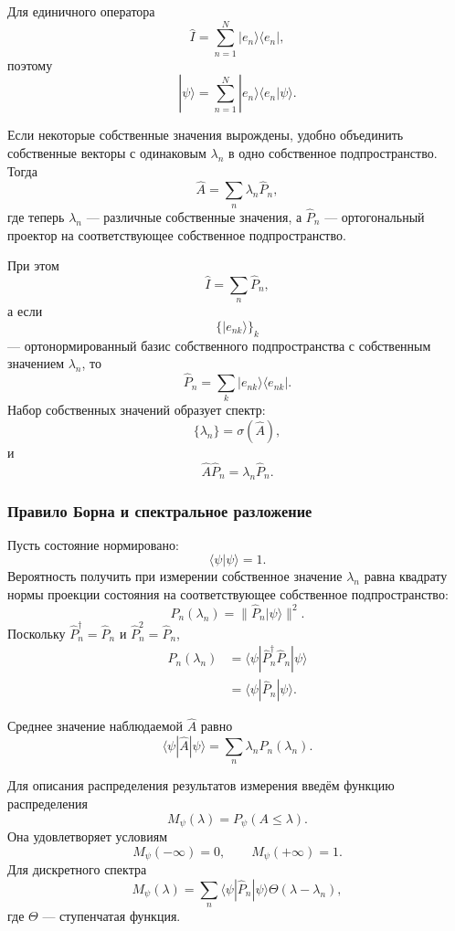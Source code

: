 \documentclass[12pt,a4paper]{article}
\begin{document}
Для единичного оператора
\[
    \boxed{
        \hat I
        =
        \sum_{n=1}^{N}
        |e_n\rangle\langle e_n|
    },
\]
поэтому
\[
    |\psi\rangle
    =
    \sum_{n=1}^{N}
        |e_n\rangle
        \langle e_n|\psi\rangle.
\]

Если некоторые собственные значения вырождены, удобно объединить
собственные векторы с одинаковым $\lambda_n$ в одно собственное
подпространство. Тогда
\[
    \boxed{
        \hat A
        =
        \sum_n
        \lambda_n\hat P_n
    },
\]
где теперь $\lambda_n$ --- различные собственные значения, а
$\hat P_n$ --- ортогональный проектор на соответствующее собственное
подпространство.

При этом
\[
    \boxed{
        \hat I=\sum_n\hat P_n
    },
\]
а если
\[
    \{|e_{nk}\rangle\}_k
\]
--- ортонормированный базис собственного подпространства с
собственным значением $\lambda_n$, то
\[
    \boxed{
        \hat P_n
        =
        \sum_k
        |e_{nk}\rangle\langle e_{nk}|
    }.
\]
Набор собственных значений образует спектр:
\[
    \{\lambda_n\}
    =
    \sigma(\hat A),
\]
и
\[
    \boxed{
        \hat A\hat P_n
        =
        \lambda_n\hat P_n
    }.
\]


\subsubsection{Правило Борна и спектральное разложение}

Пусть состояние нормировано:
\[
    \langle\psi|\psi\rangle=1.
\]
Вероятность получить при измерении собственное значение $\lambda_n$
равна квадрату нормы проекции состояния на соответствующее собственное
подпространство:
\[
    \boxed{
        P_n(\lambda_n)
        =
        \|\hat P_n|\psi\rangle\|^2
    }.
\]
Поскольку $\hat P_n^\dagger=\hat P_n$ и
$\hat P_n^2=\hat P_n$,
\begin{align*}
    P_n(\lambda_n)
    &=
    \langle\psi|
        \hat P_n^\dagger\hat P_n
    |\psi\rangle \\
    &=
    \boxed{
        \langle\psi|\hat P_n|\psi\rangle
    }.
\end{align*}

Среднее значение наблюдаемой $\hat A$ равно
\[
    \boxed{
    \langle\psi|\hat A|\psi\rangle
    =
    \sum_n
        \lambda_n
        P_n(\lambda_n)
    }.
\]

Для описания распределения результатов измерения введём функцию
распределения
\[
    M_\psi(\lambda)
    =
    P_\psi(A\leq\lambda).
\]
Она удовлетворяет условиям
\[
    \boxed{
        M_\psi(-\infty)=0,
        \qquad
        M_\psi(+\infty)=1
    }.
\]
Для дискретного спектра
\[
    \boxed{
    M_\psi(\lambda)
    =
    \sum_n
        \langle\psi|\hat P_n|\psi\rangle
        \Theta(\lambda-\lambda_n)
    },
\]
где $\Theta$ --- ступенчатая функция.
\end{document}
